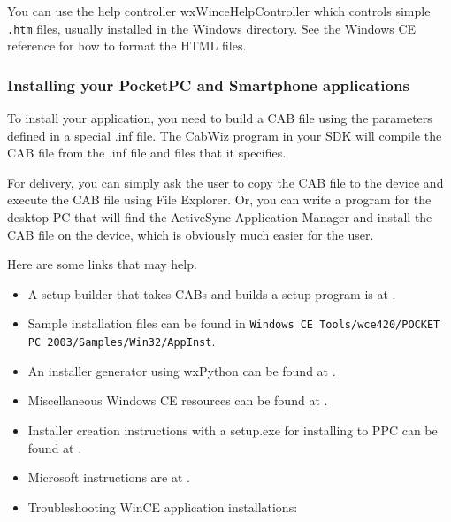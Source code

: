 You can use the help controller wxWinceHelpController which controls
simple {\tt .htm} files, usually installed in the Windows directory.
See the Windows CE reference for how to format the HTML files.

\subsubsection{Installing your PocketPC and Smartphone applications}

To install your application, you need to build a CAB file using
the parameters defined in a special .inf file. The CabWiz program
in your SDK will compile the CAB file from the .inf file and
files that it specifies.

For delivery, you can simply ask the user to copy the CAB file to the
device and execute the CAB file using File Explorer. Or, you can
write a program for the desktop PC that will find the ActiveSync
Application Manager and install the CAB file on the device,
which is obviously much easier for the user.

Here are some links that may help.

\itemsep=0pt
\begin{itemize}
\item A setup builder that takes CABs and builds a setup program is at .
\item Sample installation files can be found in {\tt Windows CE Tools/wce420/POCKET PC 2003/Samples/Win32/AppInst}.
\item An installer generator using wxPython can be found at .
\item Miscellaneous Windows CE resources can be found at .
\item Installer creation instructions with a setup.exe for installing to PPC can be found at .
\item Microsoft instructions are at .
\item Troubleshooting WinCE application installations: 
\end{itemize}

